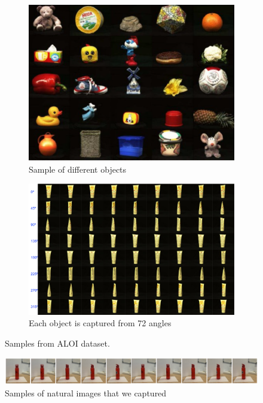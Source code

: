 \documentclass{article}
\begin{document}
\begin{figure}[h!]
  \centering
  \begin{subfigure}{0.45\textwidth}
    \centering
    \includegraphics[width=\textwidth]{images/aloiobjects.png}
    \caption{Sample of different objects}
    \label{aloiobjects}
  \end{subfigure}
  \hfill
  \begin{subfigure}{0.45\textwidth}
    \centering
    \includegraphics[width=\textwidth]{images/aloiviews.png}
    \caption{Each object is captured from 72 angles}
    \label{aloiviews}
  \end{subfigure}
  \caption{Samples from ALOI dataset.}
  \label{aloisamples}
\end{figure}

\begin{figure}[h!]
  \centering
  \includegraphics[width=\textwidth]{images/natsamples.png}
  \caption{Samples of natural images that we captured}
  \label{natsamples}
\end{figure}
\end{document}
